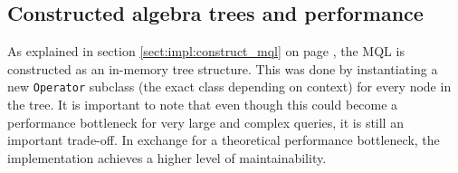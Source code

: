 \subsection{Constructed algebra trees and performance}
As explained in section \ref{sect:impl:construct_mql} on page
\pageref{sect:impl:construct_mql}, the MQL is constructed as an in-memory tree
structure. This was done by instantiating a new \texttt{Operator} subclass
(the exact class depending on context) for every node in the tree. It is
important to note that even though this could become a performance bottleneck
for very large and complex queries, it is still an important trade-off. In
exchange for a theoretical performance bottleneck, the implementation achieves a
higher level of maintainability.